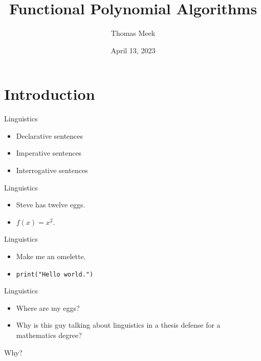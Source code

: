 \documentclass{beamer}
\title{Functional Polynomial Algorithms}
\author{Thomas Meek}
\date{April 13, 2023}
\begin{document}
\frame{\titlepage}

\section{Introduction}

\begin{frame}{Linguistics}
  \begin{itemize}
    \item<2-> Declarative sentences
    \item<3-> Imperative sentences
    \item<4> Interrogative sentences
  \end{itemize}
\end{frame}

\begin{frame}{Linguistics}
  \begin{itemize}
    \item<2-> Steve has twelve eggs.
    \item<3> $f(x) = x^2$.
  \end{itemize}
\end{frame}

\begin{frame}{Linguistics}
  \begin{itemize}
    \item<2-> Make me an omelette. 
    \item<3> \lstinline{print("Hello world.")}
  \end{itemize}
\end{frame}

\begin{frame}{Linguistics}
  \begin{itemize}
    \item<2-> Where are my eggs?
    \item<3-> Why is this guy talking about linguistics in a thesis defense for a mathematics degree?
  \end{itemize}
\end{frame}

\begin{frame}{Why?}
\end{frame}
\end{document}
